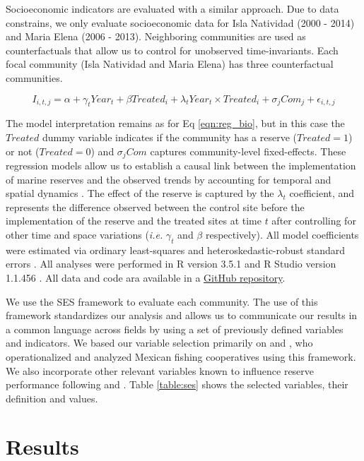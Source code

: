 \documentclass{frontiersSCNS}
\begin{document}
Socioeconomic indicators are evaluated with a similar approach. Due to
data constrains, we only evaluate socioeconomic data for Isla Natividad
(2000 - 2014) and Maria Elena (2006 - 2013). Neighboring communities are
used as counterfactuals that allow us to control for unobserved
time-invariants. Each focal community (Isla Natividad and Maria Elena)
has three counterfactual communities.

\begin{equation}
I_{i,t,j} = \alpha + \gamma_{t} Year_t + \beta Treated_i + \lambda_{t} Year_t\times Treated_i + \sigma_jCom_j +\epsilon_{i,t,j}
\label{eqn:soc_reg}
\end{equation}

The model interpretation remains as for Eq \ref{eqn:reg_bio}, but in
this case the \(Treated\) dummy variable indicates if the community has
a reserve (\(Treated = 1\)) or not (\(Treated = 0\)) and \(\sigma_jCom\)
captures community-level fixed-effects. These regression models allow us
to establish a causal link between the implementation of marine reserves
and the observed trends by accounting for temporal and spatial dynamics
\citep{depalma_2018}. The effect of the reserve is captured by the
\(\lambda_t\) coefficient, and represents the difference observed
between the control site before the implementation of the reserve and
the treated sites at time \(t\) after controlling for other time and
space variations (\emph{i.e.} \(\gamma_t\) and \(\beta\) respectively).
All model coefficients were estimated via ordinary least-squares and
heteroskedastic-robust standard errors \citep{zeileis_2004-7n}. All
analyses were performed in R version 3.5.1 and R Studio version 1.1.456
\citep{R_2018}. All data and code ara available in a
\href{https://github.com/jcvdav/ReserveEffect}{GitHub repository}.

We use the SES framework to evaluate each community. The use of this
framework standardizes our analysis and allows us to communicate our
results in a common language across fields by using a set of previously
defined variables and indicators. We based our variable selection
primarily on \citet{leslie_2015-na} and \citet{basurto_2013-oq}, who
operationalized and analyzed Mexican fishing cooperatives using this
framework. We also incorporate other relevant variables known to
influence reserve performance following \citet{difranco_2016-Xw} and
\citet{edgar_2014-UO}. Table \ref{table:ses} shows the selected
variables, their definition and values.

\hypertarget{results}{%
\section{Results}\label{results}}
\end{document}
